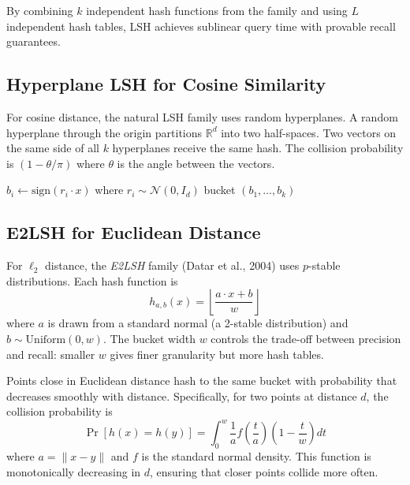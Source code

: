 \documentclass[twoside,12pt]{book}
\theoremstyle{plain}
\theoremstyle{definition}
\theoremstyle{remark}
\begin{document}
By combining $k$ independent hash functions from the family and using $L$ independent hash tables, LSH achieves sublinear query time with provable recall guarantees.

\subsection{Hyperplane LSH for Cosine Similarity}

For cosine distance, the natural LSH family uses random hyperplanes. A random hyperplane through the origin partitions $\mathbb{R}^d$ into two half-spaces. Two vectors on the same side of all $k$ hyperplanes receive the same hash. The collision probability is $(1 - \theta/\pi)$ where $\theta$ is the angle between the vectors.

\begin{algorithm}[htbp]
\caption{Hyperplane LSH for Cosine Similarity}
\label{alg:hyperplane-lsh}
\begin{algorithmic}[1]
    \State $b_i \gets \text{sign}(r_i \cdot x)$ where $r_i \sim \mathcal{N}(0, I_d)$
  \EndFor
  \State \Return bucket $(b_1, \ldots, b_k)$
\EndFunction
\end{algorithmic}
\end{algorithm}

\subsection{E2LSH for Euclidean Distance}

For $\ell_2$ distance, the \emph{E2LSH} family (Datar et al., 2004) uses $p$-stable distributions. Each hash function is
\[
h_{a,b}(x) = \left\lfloor \frac{a \cdot x + b}{w} \right\rfloor
\]
where $a$ is drawn from a standard normal (a 2-stable distribution) and $b \sim \text{Uniform}(0, w)$. The bucket width $w$ controls the trade-off between precision and recall: smaller $w$ gives finer granularity but more hash tables.

Points close in Euclidean distance hash to the same bucket with probability that decreases smoothly with distance. Specifically, for two points at distance $d$, the collision probability is
\[
\Pr[h(x) = h(y)] = \int_0^w \frac{1}{a} f\!\left(\frac{t}{a}\right) \left(1 - \frac{t}{w}\right) dt
\]
where $a = \|x - y\|$ and $f$ is the standard normal density. This function is monotonically decreasing in $d$, ensuring that closer points collide more often.
\end{document}
